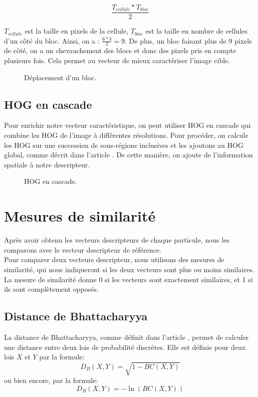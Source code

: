 \[ \frac{T_{cellule} * T_{bloc}}{2} \]

$T_{cellule}$ est la taille en pixels de la cellule,
$T_{bloc}$ est la taille en nombre de cellules d'un côté du bloc.
Ainsi, on a : $\frac{6*3}{2} = 9$. De plus, un bloc faisant plus de 9 pixels de côté, on a un chevauchement des blocs et donc des pixels pris en compte plusieurs fois. Cela permet au vecteur de mieux caractériser l'image cible.

\begin{figure}[!htbp]
\center
\caption{Déplacement d'un bloc.}
\label{fig:blocOverlap}
\end{figure}
\FloatBarrier

\subsection{HOG en cascade}

Pour enrichir notre vecteur caractéristique, on peut utiliser HOG en cascade qui combine les HOG de l'image à différentes résolutions. Pour procéder, on calcule les HOG sur une succession de sous-régions inclusives et les ajoutons au HOG global, comme décrit dans l'article \cite{qiang_zhu_fast_2006}. De cette manière, on ajoute de l'information spatiale à notre descripteur.

\begin{figure}[!htbp]
\center
\caption{HOG en cascade.}
\label{fig:cuttlefish_hog}
\end{figure}
\FloatBarrier




\section{Mesures de similarité}
Après avoir obtenu les vecteurs descripteurs de chaque particule, nous les comparons avec le vecteur descripteur de référence.\\
Pour comparer deux vecteurs descripteur, nous utilisons des mesures de similarité, qui nous indiqueront si les deux vecteurs sont plus ou moins similaires. La mesure de similarité donne 0 si les vecteurs sont exactement similaires, et 1 si ils sont complètement opposés.

\subsection{Distance de Bhattacharyya}
La distance de Bhattacharyya, comme définit dans l'article \cite{bhattacharyya_measure_1960}, permet de calculer une distance entre deux lois de probabilité discrètes. Elle est définie pour deux lois $X$ et $Y$ par la formule:
$$D_{B}(X, Y) = \sqrt{1 - BC(X, Y)}$$
ou bien encore, par la formule:
$$D_{B}(X, Y) = -\ln(BC(X, Y))$$

